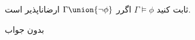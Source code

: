 ثابت کنید $\Gamma\models\phi$ اگرر $\Gamma\union\{\neg\phi\}$ ارضاناپذیر است.
\begin{ans}
بدون جواب
\end{ans}
